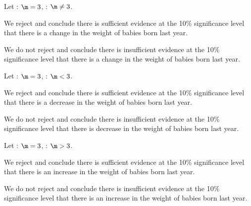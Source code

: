 \begin{solution}
    \begin{ppart}
        Let \nullhyp: $\m = 3$, \althyp: $\m \neq 3$.
        \begin{psubpart}
            We reject \nullhyp{} and conclude there is sufficient evidence at the 10\% significance level that there is a change in the weight of babies born last year.
        \end{psubpart}
        \begin{psubpart}
            We do not reject \nullhyp{} and conclude there is insufficient evidence at the 10\% significance level that there is a change in the weight of babies born last year.
        \end{psubpart}
    \end{ppart}
    \begin{ppart}
        Let \nullhyp: $\m = 3$, \althyp: $\m < 3$.
        \begin{psubpart}
            We reject \nullhyp{} and conclude there is sufficient evidence at the 10\% significance level that there is a decrease in the weight of babies born last year.
        \end{psubpart}
        \begin{psubpart}
            We do not reject \nullhyp{} and conclude there is insufficient evidence at the 10\% significance level that there is decrease in the weight of babies born last year.
        \end{psubpart}
    \end{ppart}
    \begin{ppart}
        Let \nullhyp: $\m = 3$, \althyp: $\m > 3$.
        \begin{psubpart}
            We reject \nullhyp{} and conclude there is sufficient evidence at the 10\% significance level that there is an increase in the weight of babies born last year.
        \end{psubpart}
        \begin{psubpart}
            We do not reject \nullhyp{} and conclude there is insufficient evidence at the 10\% significance level that there is an increase in the weight of babies born last year.
        \end{psubpart}
    \end{ppart}
\end{solution}

